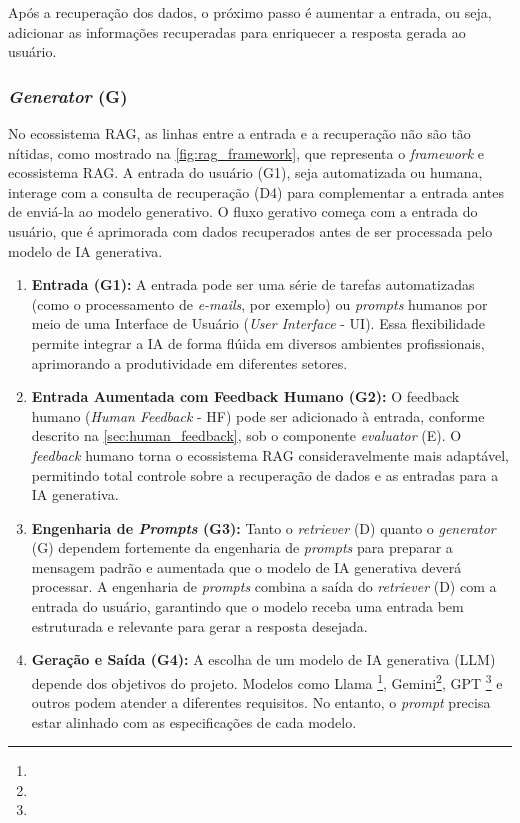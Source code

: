 \documentclass[a4paper, 12pt]{article}
\begin{document}
    Após a recuperação dos dados, o próximo passo é aumentar a entrada, ou seja, adicionar as informações recuperadas para enriquecer a resposta gerada ao usuário.

    \subsubsection{\textit{Generator} (G)}

    No ecossistema RAG, as linhas entre a entrada e a recuperação não são tão nítidas, como mostrado na \autoref{fig:rag_framework}, que representa o \textit{framework} e ecossistema RAG. A entrada do usuário (G1), seja automatizada ou humana, interage com a consulta de recuperação (D4) para complementar a entrada antes de enviá-la ao modelo generativo. O fluxo gerativo começa com a entrada do usuário, que é aprimorada com dados recuperados antes de ser processada pelo modelo de IA generativa.

    \begin{enumerate}
        \item \textbf{Entrada (G1):} A entrada pode ser uma série de tarefas automatizadas (como o processamento de \textit{e-mails}, por exemplo) ou \textit{prompts} humanos por meio de uma Interface de Usuário (\textit{User Interface} - UI). Essa flexibilidade permite integrar a IA de forma flúida em diversos ambientes profissionais, aprimorando a produtividade em diferentes setores.
        \item \textbf{Entrada Aumentada com Feedback Humano (G2):} O feedback humano (\textit{Human Feedback} - HF) pode ser adicionado à entrada, conforme descrito na \autoref{sec:human_feedback}, sob o componente \textit{evaluator} (E). O \textit{feedback} humano torna o ecossistema RAG consideravelmente mais adaptável, permitindo total controle sobre a recuperação de dados e as entradas para a IA generativa.
        \item \textbf{Engenharia de \textit{Prompts} (G3):} Tanto o \textit{retriever} (D) quanto o \textit{generator} (G) dependem fortemente da engenharia de \textit{prompts} para preparar a mensagem padrão e aumentada que o modelo de IA generativa deverá processar. A engenharia de \textit{prompts} combina a saída do \textit{retriever} (D) com a entrada do usuário, garantindo que o modelo receba uma entrada bem estruturada e relevante para gerar a resposta desejada.
        \item \textbf{Geração e Saída (G4):} A escolha de um modelo de IA generativa (LLM) depende dos objetivos do projeto. Modelos como Llama \footnote{}, Gemini\footnote{}, GPT \footnote{} e outros podem atender a diferentes requisitos. No entanto, o \textit{prompt} precisa estar alinhado com as especificações de cada modelo.
    \end{enumerate}
\end{document}
